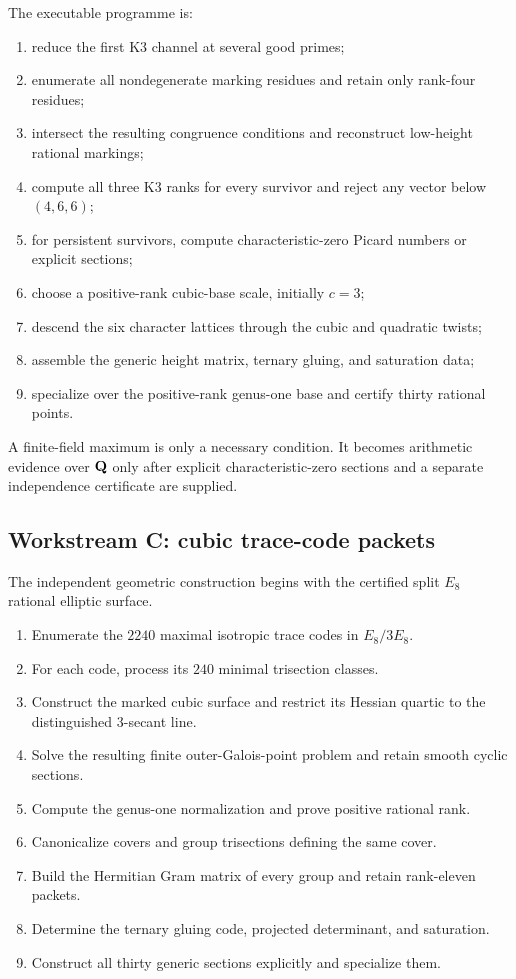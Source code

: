 The executable programme is:
\begin{enumerate}[leftmargin=*]
\item reduce the first K3 channel at several good primes;
\item enumerate all nondegenerate marking residues and retain only rank-four residues;
\item intersect the resulting congruence conditions and reconstruct low-height rational markings;
\item compute all three K3 ranks for every survivor and reject any vector below $(4,6,6)$;
\item for persistent survivors, compute characteristic-zero Picard numbers or explicit sections;
\item choose a positive-rank cubic-base scale, initially $c=3$;
\item descend the six character lattices through the cubic and quadratic twists;
\item assemble the generic height matrix, ternary gluing, and saturation data;
\item specialize over the positive-rank genus-one base and certify thirty rational points.
\end{enumerate}

A finite-field maximum is only a necessary condition.  It becomes arithmetic
evidence over $\mathbf Q$ only after explicit characteristic-zero sections and a
separate independence certificate are supplied.

\subsection{Workstream C: cubic trace-code packets}

The independent geometric construction begins with the certified split $E_8$
rational elliptic surface.

\begin{enumerate}[leftmargin=*]
\item Enumerate the $2240$ maximal isotropic trace codes in $E_8/3E_8$.
\item For each code, process its $240$ minimal trisection classes.
\item Construct the marked cubic surface and restrict its Hessian quartic to the distinguished $3$-secant line.
\item Solve the resulting finite outer-Galois-point problem and retain smooth cyclic sections.
\item Compute the genus-one normalization and prove positive rational rank.
\item Canonicalize covers and group trisections defining the same cover.
\item Build the Hermitian Gram matrix of every group and retain rank-eleven packets.
\item Determine the ternary gluing code, projected determinant, and saturation.
\item Construct all thirty generic sections explicitly and specialize them.
\end{enumerate}

